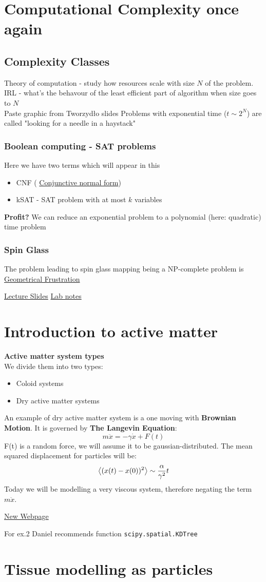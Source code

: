 \documentclass[12pt,a4paper]{report}
\newcommand{\com}[1]{{\color{red} #1}}
\newcommand{\link}[2]{{\color{cyan} \href{#1}{#2}}}
\newcounter{lec}
\newenvironment{lecture}[1]{\par\medskip
   \noindent\chapter{#1} \rmfamily}{\medskip}
\renewcommand{\emph}{\textbf}
\begin{document}
\begin{lecture}{Computational Complexity once again}
\section{Complexity Classes}
Theory of computation - study how resources scale with size $N$ of the problem. IRL - what's the behavour of the least efficient part of algorithm when size goes to $N$\\
\com{Paste graphic from Tworzydło slides}
Problems with exponential time ($t \sim 2^N$) are called "looking for a needle in a haystack"
\subsection{Boolean computing - SAT problems}
Here we have two terms which will appear in this
\begin{itemize}
    \item CNF (\link{https://en.wikipedia.org/wiki/Conjunctive_normal_form}{Conjunctive normal form}) 
    \item kSAT - SAT problem with at most $k$ variables
\end{itemize}
\emph{Profit?} We can reduce an exponential problem to a polynomial (here: quadratic) time problem

\subsection{Spin Glass}
The problem leading to spin glass mapping being a NP-complete problem is \link{https://en.wikipedia.org/wiki/Geometrical_frustration}{Geometrical Frustration}

\link{http://studenci.fuw.edu.pl/~kc427902/CMCS_2022/lab3.pdf}{Lecture Slides} \link{http://studenci.fuw.edu.pl/~kc427902/CMCS_2022/lect3.pdf}{Lab notes}
\end{lecture}


\begin{lecture}{Introduction to active matter}
    \emph{Active matter system types}\\
    We divide them into two types:
    \begin{itemize}
        \item Coloid systems
        \item Dry active matter systems
    \end{itemize}
     An example of dry active matter system is a one moving with \emph{Brownian Motion}. It is governed by \emph{The Langevin Equation}:
     \[
         m \ddot{x} = -\gamma \dot{x} + F(t)
     \]
     F(t) is a random force, we will assume it to be gaussian-distributed.
     The mean squared displacement for particles will be:
     \[
         \ev{(x(t) - x(0))^2} \sim \frac{\alpha}{\gamma^2} t
     \]
     Today we will be modelling a very viscous system, therefore negating the term $m \ddot{x}$.
\end{lecture}

\link{https://sites.google.com/uw.edu.pl/cmpp2022}{New Webpage}

For ex.2 Daniel recommends function \verb|scipy.spatial.KDTree|

\begin{lecture}{Tissue modelling as particles}

\end{lecture}

\printindex
\end{document}
